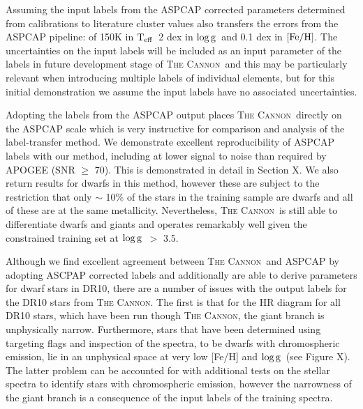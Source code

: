 \documentclass[12pt, preprint]{aastex}
\newcommand{\teff}{\mbox{$\rm T_{eff}$}}
\newcommand{\feh}{\mbox{$\rm [Fe/H]$}}
\newcommand{\logg}{\mbox{$\rm \log g$}}
\newcommand{\tc}{\textsc{The Cannon}}
\begin{document}
Assuming the input labels from the ASPCAP corrected parameters determined from calibrations to literature cluster values also transfers the errors from the ASPCAP pipeline: of 150K in \teff\,  2 dex in \logg\ and 0.1 dex in \feh.   The uncertainties on the input labels will be included as an input parameter of the labels in future development stage of \tc\ and this may be particularly relevant when introducing multiple labels of individual elements, but for this initial demonstration we assume the input labels have no associated uncertainties. 

Adopting the labels from the ASPCAP output places \tc\ directly on the ASPCAP scale which is very instructive for comparison and analysis of the label-transfer method. We demonstrate excellent reproducibility of ASPCAP labels with our method, including at lower signal to noise than required by APOGEE (SNR $\ge$ 70). This is demonstrated in detail in Section X. We also return results for dwarfs in this method, however these are subject to the restriction that only $\sim$ 10\% of the stars in the training sample are dwarfs and all of these are at the same metallicity. Nevertheless, \tc\ is still able to differentiate dwarfs and giants and operates remarkably well given the constrained training set at \logg\ $>$ 3.5. 

Although we find excellent agreement between \tc\ and ASPCAP by adopting ASCPAP corrected labels and additionally are able to derive parameters for dwarf stars in DR10, there are a number of issues with the output labels for the DR10 stars from \tc. The first is that for the HR diagram for all DR10 stars, which have been run though \tc, the giant branch is unphysically narrow. Furthermore, stars that have been determined using targeting flags and inspection of the spectra, to be dwarfs with chromospheric emission, lie in an unphysical space at very low [Fe/H] and \logg\ (see Figure X). The latter problem can be accounted for with additional tests on the stellar spectra to identify stars with chromospheric emission, however the narrowness of the giant branch is a consequence of the input labels of the training spectra. 
\end{document}
